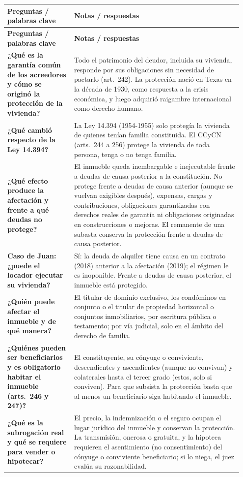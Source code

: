 \documentclass[12pt,oneside]{book}
\makeatletter
\newenvironment{cornell}{%
    \par\vspace{0.5em}
    \noindent
    \begin{longtable}{@{}>{\raggedright\arraybackslash}p{0.27\linewidth}
                         >{\raggedright\arraybackslash}p{0.68\linewidth}@{}}
    \toprule
    \textbf{Preguntas / palabras clave} & \textbf{Notas / respuestas} \\
    \midrule
    \endfirsthead
    \toprule
    \textbf{Preguntas / palabras clave} & \textbf{Notas / respuestas} \\
    \midrule
    \endhead
}{%
    \bottomrule
    \end{longtable}
}
\makeatother
\begin{document}
\begin{cornell}
\textbf{¿Qué es la garantía común de los acreedores y cómo se originó la protección de la vivienda?} &
Todo el patrimonio del deudor, incluida su vivienda, responde por sus obligaciones sin necesidad de pactarlo (art.~242). La protección nació en Texas en la década de 1930, como respuesta a la crisis económica, y luego adquirió raigambre internacional como derecho humano. \\

\textbf{¿Qué cambió respecto de la Ley 14.394?} &
La Ley 14.394 (1954-1955) solo protegía la vivienda de quienes tenían familia constituida. El CCyCN (arts.~244 a 256) protege la vivienda de toda persona, tenga o no tenga familia. \\

\textbf{¿Qué efecto produce la afectación y frente a qué deudas no protege?} &
El inmueble queda inembargable e inejecutable frente a deudas de causa posterior a la constitución. No protege frente a deudas de causa anterior (aunque se vuelvan exigibles después), expensas, cargas y contribuciones, obligaciones garantizadas con derechos reales de garantía ni obligaciones originadas en construcciones o mejoras. El remanente de una subasta conserva la protección frente a deudas de causa posterior. \\

\textbf{Caso de Juan: ¿puede el locador ejecutar su vivienda?} &
Sí: la deuda de alquiler tiene causa en un contrato (2018) anterior a la afectación (2019); el régimen le es inoponible. Frente a deudas de causa posterior, el inmueble está protegido. \\

\textbf{¿Quién puede afectar el inmueble y de qué manera?} &
El titular de dominio exclusivo, los condóminos en conjunto o el titular de propiedad horizontal o conjuntos inmobiliarios, por escritura pública o testamento; por vía judicial, solo en el ámbito del derecho de familia. \\

\textbf{¿Quiénes pueden ser beneficiarios y es obligatorio habitar el inmueble (arts.~246 y 247)?} &
El constituyente, su cónyuge o conviviente, descendientes y ascendientes (aunque no convivan) y colaterales hasta el tercer grado (estos, solo si conviven). Para que subsista la protección basta que al menos un beneficiario siga habitando el inmueble. \\

\textbf{¿Qué es la subrogación real y qué se requiere para vender o hipotecar?} &
El precio, la indemnización o el seguro ocupan el lugar jurídico del inmueble y conservan la protección. La transmisión, onerosa o gratuita, y la hipoteca requieren el asentimiento (no consentimiento) del cónyuge o conviviente beneficiario; si lo niega, el juez evalúa su razonabilidad. \\


\end{cornell}
\end{document}
